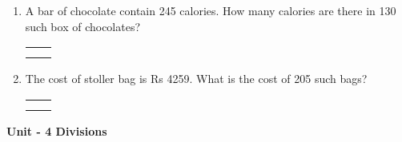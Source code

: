 \begin{enumerate}
    \item A bar of chocolate contain 245 calories. How many calories are there in 130 such box of chocolates?

    \begin{myTableStyle} \begin{tabular}{ |m{10cm}|m{3cm}| } \hline
        &  \\\hline
        &  \\\hline
        \multicolumn{2}{|c|}{} \\\hline
    \end{tabular} \end{myTableStyle} \vspace{0.08in}

    \item The cost of stoller bag is Rs 4259. What is the cost of 205 such bags?

    \begin{myTableStyle} \begin{tabular}{ |m{10cm}|m{3cm}| } \hline
        &  \\\hline
        &  \\\hline
        \multicolumn{2}{|c|}{} \\\hline
    \end{tabular} \end{myTableStyle} \vspace{0.08in}

\end{enumerate}

\newpage \centerline{\textbf{ \LARGE  Unit - 4 \quad Divisions }}

